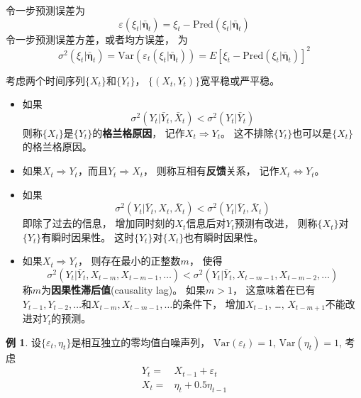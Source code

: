 \documentclass[
]{book}
\providecommand{\tightlist}{%
  \setlength{\itemsep}{0pt}\setlength{\parskip}{0pt}}
\theoremstyle{definition}
\theoremstyle{definition}
\newtheorem{example}{例}[chapter]
\theoremstyle{definition}
\theoremstyle{definition}
\theoremstyle{remark}
\begin{document}
令一步预测误差为
\[
  \varepsilon(\xi_t | \bar{\boldsymbol{\eta}}_t) 
  = \xi_t - \text{Pred}(\xi_t | \bar{\boldsymbol{\eta}}_t)
\]
令一步预测误差方差，或者均方误差，
为
\[
  \sigma^2(\xi_t | \bar{\boldsymbol{\eta}}_t)  
  = \text{Var}(\varepsilon_t(\xi_t | \bar{\boldsymbol{\eta}}_t) )
  = E \left[ \xi_t - \text{Pred}(\xi_t | \bar{\boldsymbol{\eta}}_t) \right]^2
\]

考虑两个时间序列\(\{ X_t \}\)和\(\{ Y_t \}\)，
\(\{(X_t, Y_t) \}\)宽平稳或严平稳。

\begin{itemize}
\tightlist
\item
  如果
  \[
  \sigma^2(Y_t | \bar Y_t, \bar X_t) < \sigma^2(Y_t | \bar Y_t)
  \]
  则称\(\{ X_t \}\)是\(\{ Y_t \}\)的\textbf{格兰格原因}，
  记作\(X_t \Rightarrow Y_t\)。
  这不排除\(\{ Y_t \}\)也可以是\(\{ X_t \}\)的格兰格原因。
\item
  如果\(X_t \Rightarrow Y_t\)，而且\(Y_t \Rightarrow X_t\)，
  则称互相有\textbf{反馈}关系，
  记作\(X_t \Leftrightarrow Y_t\)。
\item
  如果
  \[
  \sigma^2(Y_t | \bar Y_t, X_t, \bar X_t) < \sigma^2(Y_t | \bar Y_t, \bar X_t)
  \]
  即除了过去的信息，
  增加同时刻的\(X_t\)信息后对\(Y_t\)预测有改进，
  则称\(\{X_t \}\)对\(\{Y_t \}\)有瞬时因果性。
  这时\(\{Y_t \}\)对\(\{X_t \}\)也有瞬时因果性。
\item
  如果\(X_t \Rightarrow Y_t\)，
  则存在最小的正整数\(m\)，
  使得
  \[
  \sigma^2(Y_t | \bar Y_t, X_{t-m}, X_{t-m-1}, \dots) 
  < \sigma^2(Y_t | \bar Y_t, X_{t-m-1}, X_{t-m-2}, \dots) 
  \]
  称\(m\)为\textbf{因果性滞后值}(causality lag)。
  如果\(m>1\)，
  这意味着在已有\(Y_{t-1}, Y_{t-2}, \dots\)和\(X_{t-m}, X_{t-m-1}, \dots\)的条件下，
  增加\(X_{t-1}\), \dots, \(X_{t-m+1}\)不能改进对\(Y_t\)的预测。
\end{itemize}

\begin{example}
\protect\hypertarget{exm:causal-exaxylag1}{}{\label{exm:causal-exaxylag1} }设\(\{ \varepsilon_t, \eta_t \}\)是相互独立的零均值白噪声列，
\(\text{Var}(\varepsilon_t)=1\),
\(\text{Var}(\eta_t)=1\),
考虑
\[\begin{aligned}
Y_t =& X_{t-1} + \varepsilon_t \\
X_t =& \eta_t + 0.5 \eta_{t-1}
\end{aligned}\]
\end{example}
\end{document}
